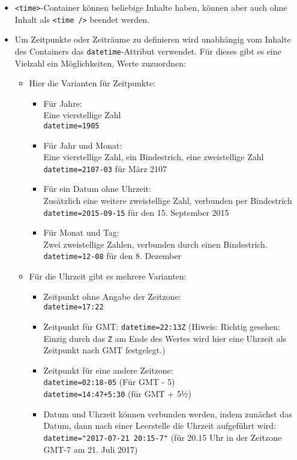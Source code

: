 \begin{itemize}
	\item \verb|<time>|-Container können beliebige Inhalte haben, können aber auch ohne Inhalt als \verb|<time />| beendet werden.
	\item Um Zeitpunkte oder Zeiträume zu definieren wird unabhängig vom Inhalte des Containers das \verb|datetime|-Attribut verwendet. Für dieses gibt es eine Vielzahl ein Möglichkeiten, Werte zuzuordnen:
	\begin{itemize}
		\item Hier die Varianten für Zeitpunkte:
		\begin{itemize}
			\item Für Jahre:\\
			Eine vierstellige Zahl\\
			\verb|datetime=1905|
			\item Für Jahr und Monat:\\
			Eine vierstellige Zahl, ein Bindestrich, eine zweistellige Zahl\\
			\verb|datetime=2107-03| für März 2107
			\item Für ein Datum ohne Uhrzeit:\\
			Zusätzlich eine weitere zweistellige Zahl, verbunden per Bindestrich\\
			\verb|datetime=2015-09-15| für den 15. September 2015
			\item Für Monat und Tag:\\
			Zwei zweistellige Zahlen, verbunden durch einen Bindestrich.\\
			\verb|datetime=12-08| für den 8. Dezember
		\end{itemize}
		\item Für die Uhrzeit gibt es mehrere Varianten:
		\begin{itemize}
			\item Zeitpunkt ohne Angabe der Zeitzone:\\
			\verb|datetime=17:22|
			\item Zeitpunkt für GMT:
			\verb|datetime=22:13Z| (Hiweis: Richtig gesehen: Einzig durch das \verb|Z| am Ende des Wertes wird hier eine Uhrzeit als Zeitpunkt nach GMT festgelegt.)
			\item Zeitpunkt für eine andere Zeitzone:\\
			\verb|datetime=02:18-05| (Für GMT - 5)\\
			\verb|datetime=14:47+5:30|	(für GMT + 5½)
			\item Datum und Uhrzeit können verbunden werden, indem zunächst das Datum, dann nach einer Leerstelle die Uhrzeit aufgeführt wird:\\
			\verb|datetime="2017-07-21 20:15-7"| (für 20.15 Uhr in der Zeitzone GMT-7 am 21. Juli 2017)
		\end{itemize}
	\end{itemize}
\end{itemize}

